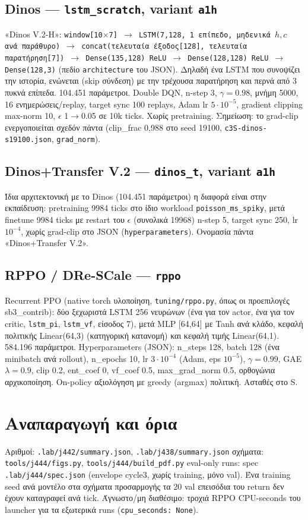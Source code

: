 \documentclass[10pt,a4paper]{article}
\newcommand{\ptr}[1]{{\footnotesize\texttt{#1}}}
\begin{document}
\subsection{Dinos --- \texttt{lstm\_scratch}, variant \texttt{a1h}}
«Dinos V.2-H»: \texttt{window[10$\times$7] $\to$ LSTM(7,128, 1 επίπεδο, μηδενικά $h,c$ ανά παράθυρο) $\to$ concat(τελευταία έξοδος[128], τελευταία παρατήρηση[7]) $\to$ Dense(135,128) ReLU $\to$ Dense(128,128) ReLU $\to$ Dense(128,3)} (πεδίο \texttt{architecture} του JSON). Δηλαδή ένα LSTM που συνοψίζει την ιστορία, ενώνεται (skip σύνδεση) με την τρέχουσα παρατήρηση και περνά από 3 πυκνά επίπεδα. 104.451 παράμετροι. Double DQN, n-step 3, $\gamma=0.98$, μνήμη 5000, 16 ενημερώσεις/replay, target sync 100 replays, Adam lr $5\cdot10^{-5}$, gradient clipping max-norm 10, $\epsilon$ 1$\to$0.05 σε 10k ticks. Χωρίς pretraining. Σημείωση: το grad-clip ενεργοποιείται σχεδόν πάντα (clip\_frac 0,988 στο seed 19100, \ptr{c3S-dinos-s19100.json}, \texttt{grad\_norm}).

\subsection{Dinos+Transfer V.2 --- \texttt{dinos\_t}, variant \texttt{a1h}}
Ίδια αρχιτεκτονική με το Dinos (104.451 παράμετροι)\textperiodcentered{} η διαφορά είναι στην εκπαίδευση: pretraining 9984 ticks στο ίδιο workload \texttt{poisson\_ms\_spiky}, μετά finetune 9984 ticks με restart του $\epsilon$ (συνολικά 19968)\textperiodcentered{} n-step 5, target sync 250, lr $10^{-4}$, χωρίς grad-clip στο JSON (\texttt{hyperparameters}). Ονομασία πάντα «Dinos+Transfer V.2».

\subsection{RPPO / DRe-SCale --- \texttt{rppo}}
Recurrent PPO (native torch υλοποίηση, \ptr{tuning/rppo.py}, όπως οι προεπιλογές sb3\_contrib): δύο ξεχωριστά LSTM 256 νευρώνων (ένα για τον actor, ένα για τον critic, \texttt{lstm\_pi}, \texttt{lstm\_vf}, είσοδος 7), μετά MLP [64,64] με Tanh ανά κλάδο, κεφαλή πολιτικής Linear(64,3) (κατηγορική κατανομή) και κεφαλή τιμής Linear(64,1). 584.196 παράμετροι. Hyperparameters (JSON): n\_steps 128, batch 128 (ένα minibatch ανά rollout), n\_epochs 10, lr $3\cdot10^{-4}$ (Adam, eps $10^{-5}$), $\gamma=0.99$, GAE $\lambda=0.9$, clip 0.2, ent\_coef 0, vf\_coef 0.5, max\_grad\_norm 0.5, ορθογώνια αρχικοποίηση. On-policy\textperiodcentered{} αξιολόγηση με greedy (argmax) πολιτική. Ασταθές στο S.

\section{Αναπαραγωγή και όρια}
Αριθμοί: \ptr{.lab/j442/summary.json}, \ptr{.lab/j438/summary.json}\textperiodcentered{} σχήματα: \ptr{tools/j444/figs.py}, \ptr{tools/j444/build\_pdf.py}\textperiodcentered{} eval-only runs: spec \ptr{.lab/j444/spec.json} (envelope cycle3, χωρίς training, μόνο val). Ένα training seed ανά μοντέλο στα σχήματα προσαρμογής\textperiodcentered{} τα 20 val επεισόδια του return δεν έχουν καταγραφεί ανά tick. Άγνωστο/μη διαθέσιμο: τροχιά RPPO\textperiodcentered{} CPU-seconds του launcher για τα εξωτερικά runs (\texttt{cpu\_seconds: None}).
\end{document}
